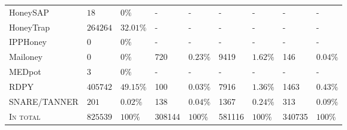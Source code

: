 \begin{table}
\begin{tabularx}{\linewidth}{l|XX|XX|XX|XX}
        HoneySAP \cite{honeysap2021}              & $18$                                   & $0\%$                                    & -                                & -                                  & -               & -             & -               & -             \\
        HoneyTrap \cite{honeytrap2021}            & $264264$                               & $32.01\%$                                & -                                & -                                  & -               & -             & -               & -             \\
        IPPHoney \cite{ipphoney2021}              & $0$                                    & $0\%$                                    & -                                & -                                  & -               & -             & -               & -             \\
        Mailoney \cite{mailoney2021}              & $0$                                    & $0\%$                                    & 720                              & $0.23\%$                           & 9419            & $1.62\%$      & 146             & $0.04\%$      \\
        MEDpot \cite{medpot2021}                  & $3$                                    & $0\%$                                    & -                                & -                                  & -               & -             & -               & -             \\
        RDPY \cite{rdpy2021}                      & $405742$                               & $49.15\%$                                & 100                              & $0.03\%$                           & 7916            & $1.36\%$      & 1463            & $0.43\%$      \\
        SNARE/TANNER \cite{snare2021}             & $201$                                  & $0.02\%$                                 & 138                              & $0.04\%$                           & 1367            & $0.24\%$      & 313             & $0.09\%$      \\
        \hline
        \textsc{In total}                         & $825539$                               & $100\%$                                  & 308144                           & $100\%$                            & 581116          & $100\%$       & 340735          & $100\%$       \\
        \bottomrule
    \end{tabularx}
    \label{tab:overview-honeypots-attacks}
\end{table}

